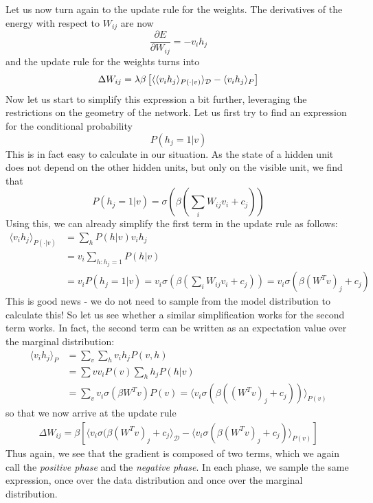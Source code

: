 \documentclass[a4paper, draft]{article}
\theoremstyle{own}
\theoremstyle{remark}
\begin{document}
Let us now turn again to the update rule for the weights.
The derivatives of the energy with respect to $W_{ij}$ are now
$$
\frac{\partial E}{\partial W_{ij}} = - v_i h_j
$$
and the update rule for the weights turns into
$$
\Delta W_{ij} = \\
 \lambda \beta \left[
\langle \langle  v_i h_j \rangle_{P(\cdot | v)} \rangle_{\mathcal D} 
- 
\langle v_i h_j \rangle_P  
\right] 
$$
Now let us start to simplify this expression a bit further, leveraging the restrictions on the geometry of the network. Let us first try to find an expression for the conditional probability
$$
P(h_j = 1 | v)
$$
This is in fact easy to calculate in our situation. As the state of a hidden unit does not depend on the other hidden units, but only on the visible unit, we find that
$$
P(h_j = 1 | v)=  \sigma(\beta (\sum_i W_{ij} v_i + c_j)) 
$$
Using this, we can already simplify the first term in the update rule as follows:
\begin{align*}
\langle v_i h_j \rangle_{P(\cdot | v)} &= \sum_h P(h | v) v_i h_j \\
&= v_i   \sum_{h : h_j = 1} P(h | v)   \\
&= v_i P(h_j = 1 | v) = v_i \sigma(\beta (\sum_i W_{ij} v_i + c_j)) 
= v_i \sigma(\beta (W^T v)_j + c_j)
\end{align*}
This is good news - we do not need to sample from the model distribution to calculate this! So let us see whether a similar simplification works for the second term works.  In fact, the second term can be written as an expectation value over the marginal distribution:
\begin{align*}
\langle v_i h_j \rangle_P &= \sum_v \sum_h v_i h_j P(v,h) \\
&= \sum v v_i P(v) \sum_h h_j P(h | v) \\
&= \sum_v v_i \sigma(\beta W^T v) P(v) = \langle v_i \sigma(\beta ((W^T v)_j + c_j)) \rangle_{P(v)}
\end{align*}
so that we now arrive at the update rule
\begin{align}\label{eq:rbmupdaterule}
\Delta W_{ij} = \beta \left[
\langle v_i \sigma(\beta (W^T v)_j + c_j \rangle_{\mathcal D}
-
\langle v_i \sigma(\beta (W^T v)_j + c_j) \rangle_{P(v)}
\right]
\end{align}
Thus again, we see that the gradient is composed of two terms, which we again call the {\em positive phase} and the {\em negative phase}. In each phase, we sample the same expression, once over the data distribution and once over the marginal distribution.
\end{document}
